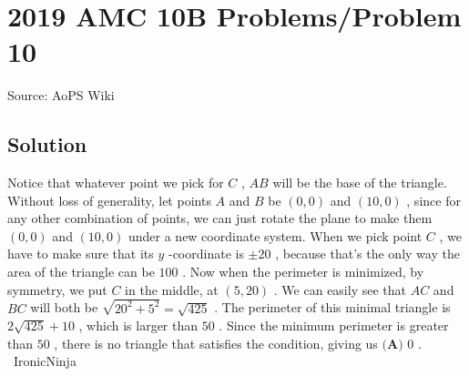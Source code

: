 \documentclass[12pt]{article}
\begin{document}
\section*{{2019 AMC 10B Problems/Problem 10}}
Source: AoPS Wiki

\subsection*{Solution}
Notice that whatever point we pick for $C$ , $AB$ will be the base of the triangle. Without loss of generality, let points $A$ and $B$ be $(0,0)$ and $(10,0)$ , since for any other combination of points, we can just rotate the plane to make them $(0,0)$ and $(10,0)$ under a new coordinate system. When we pick point $C$ , we have to make sure that its $y$ -coordinate is $\pm20$ , because that's the only way the area of the triangle can be $100$ . Now when the perimeter is minimized, by symmetry, we put $C$ in the middle, at $(5, 20)$ . We can easily see that $AC$ and $BC$ will both be $\sqrt{20^2+5^2} = \sqrt{425}$ . The perimeter of this minimal triangle is $2\sqrt{425} + 10$ , which is larger than $50$ . Since the minimum perimeter is greater than $50$ , there is no triangle that satisfies the condition, giving us $\boxed{\textbf{(A) }0}$ . ~IronicNinja
\end{document}
